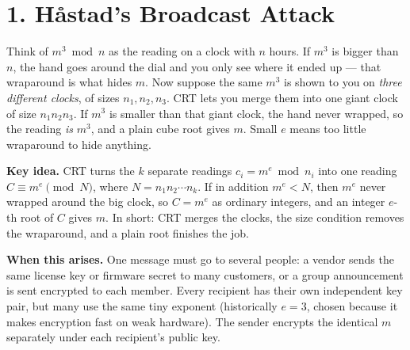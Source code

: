 \documentclass[11pt]{article}
\begin{document}
\bigskip
\hrulefill

\section*{1. Håstad's Broadcast Attack}

\begin{intuition}
Think of $m^3 \bmod n$ as the reading on a clock with $n$ hours. If $m^3$ is bigger than $n$, the hand goes around the dial and you only see where it ended up --- that wraparound is what hides $m$. Now suppose the same $m^3$ is shown to you on \emph{three different clocks}, of sizes $n_1,n_2,n_3$. CRT lets you merge them into one giant clock of size $n_1n_2n_3$. If $m^3$ is smaller than that giant clock, the hand never wrapped, so the reading \emph{is} $m^3$, and a plain cube root gives $m$. Small $e$ means too little wraparound to hide anything.
\end{intuition}

\textbf{Key idea.} CRT turns the $k$ separate readings $c_i=m^e \bmod n_i$ into one reading $C\equiv m^e \pmod N$, where $N=n_1n_2\cdots n_k$. If in addition $m^e<N$, then $m^e$ never wrapped around the big clock, so $C=m^e$ as ordinary integers, and an integer $e$-th root of $C$ gives $m$. In short: CRT merges the clocks, the size condition removes the wraparound, and a plain root finishes the job.

\textbf{When this arises.} One message must go to several people: a vendor sends the same license key or firmware secret to many customers, or a group announcement is sent encrypted to each member. Every recipient has their own independent key pair, but many use the same tiny exponent (historically $e=3$, chosen because it makes encryption fast on weak hardware). The sender encrypts the identical $m$ separately under each recipient's public key.
\end{document}
